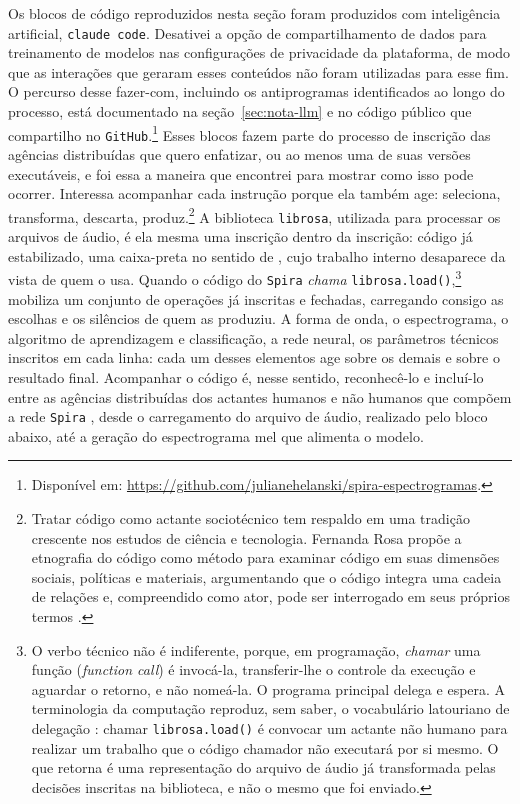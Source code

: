 Os blocos de código reproduzidos nesta seção foram produzidos com inteligência artificial, \texttt{claude code}. Desativei a opção de compartilhamento de dados para treinamento de modelos nas configurações de privacidade da plataforma, de modo que as interações que geraram esses conteúdos não foram utilizadas para esse fim. O percurso desse fazer-com, incluindo os antiprogramas identificados ao longo do processo, está documentado na seção~\ref{sec:nota-llm} e no código público que compartilho no \texttt{GitHub}.\footnote{ Disponível em: \url{https://github.com/julianehelanski/spira-espectrogramas}.} Esses blocos fazem parte do processo de inscrição das agências distribuídas que quero enfatizar, ou ao menos uma de suas versões executáveis, e foi essa a maneira que encontrei para mostrar como isso pode ocorrer. Interessa acompanhar cada instrução porque ela também age: seleciona, transforma, descarta, produz.\footnote{Tratar código como actante sociotécnico tem respaldo em uma tradição crescente nos estudos de ciência e tecnologia. Fernanda Rosa propõe a etnografia do código como método para examinar código em suas dimensões sociais, políticas e materiais, argumentando que o código integra uma cadeia de relações e, compreendido como ator, pode ser interrogado em seus próprios termos \parencite{Rosa2022Code}.} A biblioteca \texttt{librosa}, utilizada para processar os arquivos de áudio, é ela mesma uma inscrição dentro da inscrição: código já estabilizado, uma caixa-preta no sentido de \textcite{Latour2011CienciaEmAcao}, cujo trabalho interno desaparece da vista de quem o usa. Quando o código do \texttt{Spira} \textit{chama} \texttt{librosa.load()},\footnote{O verbo técnico não é indiferente, porque, em programação, \textit{chamar} uma função (\textit{function call}) é invocá-la, transferir-lhe o controle da execução e aguardar o retorno, e não nomeá-la. O programa principal delega e espera. A terminologia da computação reproduz, sem saber, o vocabulário latouriano de delegação \parencite{Latour1992Missing}: chamar \texttt{librosa.load()} é convocar um actante não humano para realizar um trabalho que o código chamador não executará por si mesmo. O que retorna é uma representação do arquivo de áudio já transformada pelas decisões inscritas na biblioteca, e não o mesmo que foi enviado.} mobiliza um conjunto de operações já inscritas e fechadas, carregando consigo as escolhas e os silêncios de quem as produziu. A forma de onda, o espectrograma, o algoritmo de aprendizagem e classificação, a rede neural, os parâmetros técnicos inscritos em cada linha: cada um desses elementos age sobre os demais e sobre o resultado final. Acompanhar o código é, nesse sentido, reconhecê-lo e incluí-lo entre as agências distribuídas dos actantes humanos e não humanos que compõem a rede \texttt{Spira} \parencite{Latour2017Esperanca}, desde o carregamento do arquivo de áudio, realizado pelo bloco abaixo, até a geração do espectrograma mel que alimenta o modelo.

